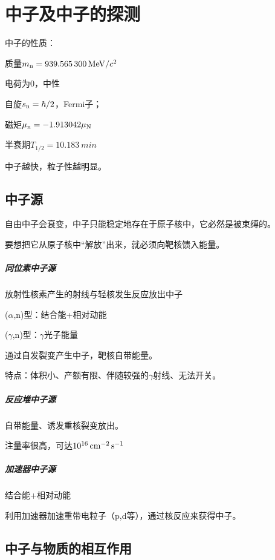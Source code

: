 \chapter{中子及中子的探测}
中子的性质：
\begin{compactitem}
	\item 质量$m_\mathrm n = \qty{939.565300}{MeV}/c^2$
	\item 电荷为0，中性
	\item 自旋$s_\mathrm n = \hbar/2$，Fermi子；
	\item 磁矩$\mu_\mathrm n = -1.913042\mu_{\mathrm{N}}$
	\item 半衰期$T_{1/2} = \qty{10.183}{min}$
\end{compactitem}
中子越快，粒子性越明显。

\section{中子源}

自由中子会衰变，中子只能稳定地存在于原子核中，它必然是被束缚的。

要想把它从原子核中“解放”出来，就必须向靶核馈入能量。
\paragraph{同位素中子源}放射性核素产生的射线与轻核发生反应放出中子
\begin{compactitem}
	\item ($\alpha$,n)型：结合能+相对动能
	\item ($\gamma$,n)型：$\gamma$光子能量 
\end{compactitem}
通过自发裂变产生中子，靶核自带能量。

特点：体积小、产额有限、伴随较强的$\gamma$射线、无法开关。
\paragraph{反应堆中子源}自带能量、诱发重核裂变放出。

注量率很高，可达$\qty{E16}{\per\centi\metre\squared\per\second}$
\paragraph{加速器中子源}结合能+相对动能

利用加速器加速重带电粒子（p,d等），通过核反应来获得中子。

\section{中子与物质的相互作用}

